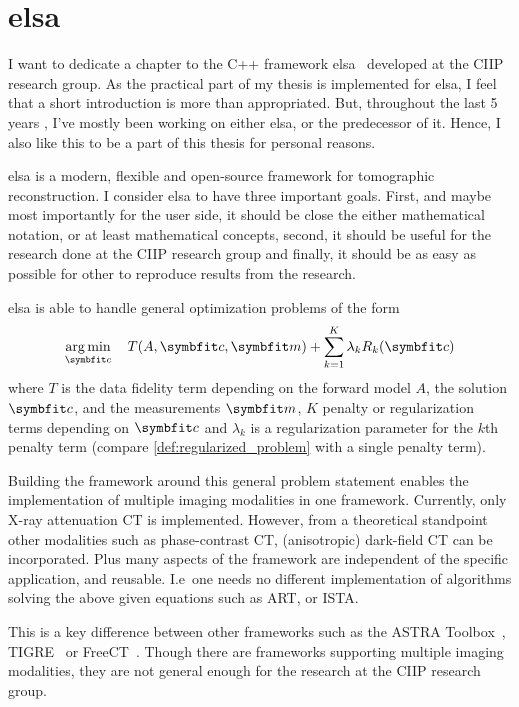 \chapter{elsa}\label{chap:elsa}

I want to dedicate a chapter to the C++ framework elsa~\cite{lasser_elsa_2019} developed at the
\gls{CIIP} research group. As the practical part of my thesis is implemented for elsa, I feel that a
short introduction is more than appropriated. But, throughout the last 5 years , I've mostly been
working on either elsa, or the predecessor of it. Hence, I also like this to be a part of this
thesis for personal reasons.

elsa is a modern, flexible and open-source framework for tomographic reconstruction. I consider elsa
to have three important goals. First, and maybe most importantly for the user side, it should be
close the either mathematical notation, or at least mathematical concepts, second, it should be
useful for the research done at the \gls{CIIP} research group and finally, it should be as easy as
possible for other to reproduce results from the research.

elsa is able to handle general optimization problems of the form
\[ \argmin_{\mvec{c}} \quad T(A, \mvec{c}, \mvec{m}) + \sum_{k=1}^K \lambda_k R_k(\mvec{c}) \]
where \(T\) is the data fidelity term depending on the forward model \(A\), the solution
\(\mvec{c}\), and the measurements \(\mvec{m}\), \(K\) penalty or regularization terms depending on
\(\mvec{c}\) and \(\lambda_k\) is a regularization parameter for the \(k\)th penalty term (compare
\autoref{def:regularized_problem} with a single penalty term).

Building the framework around this general problem statement enables the implementation of multiple
imaging modalities in one framework. Currently, only X-ray attenuation CT is implemented. However,
from a theoretical standpoint other modalities such as phase-contrast CT, (anisotropic) dark-field
CT can be incorporated. Plus many aspects of the framework are independent of the specific
application, and reusable. I.e\ one needs no different implementation of algorithms solving the
above given equations such as \gls{ART}, or \gls{ISTA}\@.

This is a key difference between other frameworks such as the ASTRA
Toolbox~\cite{van_aarle_fast_2016}, TIGRE~\cite{biguri_tigre_2016} or
FreeCT~\cite{hoffman_technical_2016}. Though there are frameworks supporting multiple imaging
modalities, they are not general enough for the research at the \gls{CIIP} research group.

